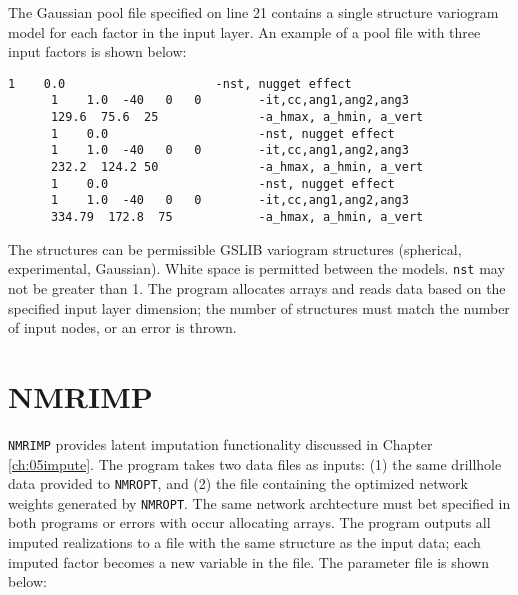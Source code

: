 The Gaussian pool file specified on line 21 contains a single structure variogram model for each factor in the input layer. An example of a pool file with three input factors is shown below:

\begin{framed}
   \begin{lstlisting}[style=ccgParameterfile]
      1    0.0                     -nst, nugget effect
      1    1.0  -40   0   0        -it,cc,ang1,ang2,ang3
      129.6  75.6  25              -a_hmax, a_hmin, a_vert  
      1    0.0                     -nst, nugget effect
      1    1.0  -40   0   0        -it,cc,ang1,ang2,ang3
      232.2  124.2 50              -a_hmax, a_hmin, a_vert
      1    0.0                     -nst, nugget effect
      1    1.0  -40   0   0        -it,cc,ang1,ang2,ang3
      334.79  172.8  75            -a_hmax, a_hmin, a_vert  
   \end{lstlisting}
\end{framed}

The structures can be permissible GSLIB variogram structures (spherical, experimental, Gaussian). White space is permitted between the models. \texttt{nst} may not be greater than 1. The program allocates arrays and reads data based on the specified input layer dimension; the number of structures must match the number of input nodes, or an error is thrown.

\FloatBarrier
\section{NMRIMP}
\label{sect:Anmrimp}

\texttt{NMRIMP} provides latent imputation functionality discussed in Chapter \ref{ch:05impute}. The program takes two data files as inputs: (1) the same drillhole data provided to \texttt{NMROPT}, and (2) the file containing the optimized network weights generated by \texttt{NMROPT}. The same network archtecture must bet specified in both programs or errors with occur allocating arrays. The program outputs all imputed realizations to a file with the same structure as the input data; each imputed factor becomes a new variable in the file. The parameter file is shown below:

